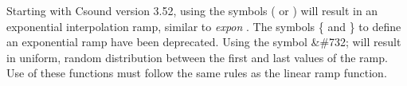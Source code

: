   Starting with Csound version 3.52, using the symbols ( or ) will result in an exponential interpolation ramp, similar to \emph{expon}
. The symbols \{ and \} to define an exponential ramp have been deprecated. Using the symbol \&\#732; will result in uniform, random distribution between the first and last values of the ramp. Use of these functions must follow the same rules as the linear ramp function. 


\begin{comment}
\begin{tabular}{lcr}
Previous &Home &Next \\
Next-P and Previous-P Symbols &Up &Score Macros

\end{tabular}



\end{comment}
